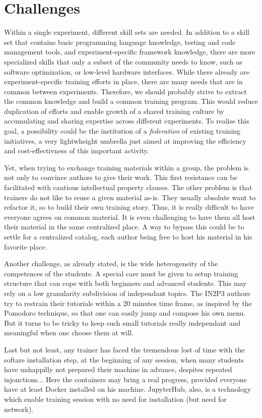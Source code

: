 \documentclass[12pt,a4paper]{article}
\begin{document}
\section{Challenges}

Within a single experiment, different skill sets are needed. In addition to a
skill set that contains basic programming language knowledge, testing and code
management tools, and experiment-specific framework knowledge, there are more
specialized skills that only a subset of the community needs to know, such as
software optimization, or low-level hardware interfaces.
While there already are experiment-specific training efforts in place, there are
many needs that are in common between experiments. Therefore, we should probably
strive to extract the common knowledge and build a common training program. This
would reduce duplication of efforts and enable growth of a shared training
culture by accumulating and sharing expertise across different experiments.
To realise this goal, a possibility could be the institution of a {\em
federation} of existing training initiatives, a very lightwheight umbrella just
aimed at improving the efficiency and cost-effectivness of this important
activity.

Yet, when trying to exchange training materials within a group, the problem
is not only to convince authors to give their work. This first resistance
can be facilitated with cautious intellectual property clauses. The other
problem is that trainers do not like to reuse a given material as-is. They usually
absolute want to refactor it, so to build their own training story.
Thus, it is really difficult to have everyone agrees on common material.
It is even challenging to have them all host their material in the same
centralized place. A way to bypass this could be to settle for a centralized
catalog, each author being free to host his material in his favorite place.

Another challenge, as already stated, is the wide heterogeneity of the
competences of the students. A special care must be given to setup
training structure that can cope with both beginners and advanced students.
This may rely on a low granularity subdivision of independant topics.
The IN2P3 authors try to restrain their tutorials within a 20 minutes
time frame, as inspired by the Pomodoro technique, so that one can easily jump
and compose his own menu. But it turns to be tricky to keep such small
tutorials really independant and meaningful when one choose them at will.

Last but not least, any trainer has faced the tremendous lost of time
with the softare installation step, at the beginning of any session, when
many students have unhappilly not prepared their machine in advance,
despites repeated injonctions... Here the containers may bring a real
progress, provided everyone have at least Docker installed on his machine.
JupyterHub, also, is a technology which enable training session with
no need for installation (but need for network).
\end{document}
